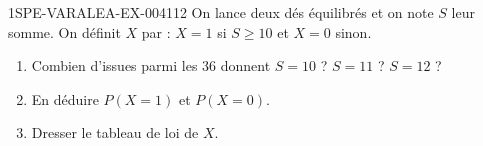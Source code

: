 \begin{exercice}{1SPE-VARALEA-EX-004}{1}{12}
On lance deux dés équilibrés et on note $S$ leur somme. On définit $X$ par : $X = 1$ si $S \geq 10$ et $X = 0$ sinon.

\begin{enumerate}
  \item Combien d'issues parmi les $36$ donnent $S = 10$ ? $S = 11$ ? $S = 12$ ?
  \item En déduire $P(X = 1)$ et $P(X = 0)$.
  \item Dresser le tableau de loi de $X$.
\end{enumerate}
\end{exercice}
